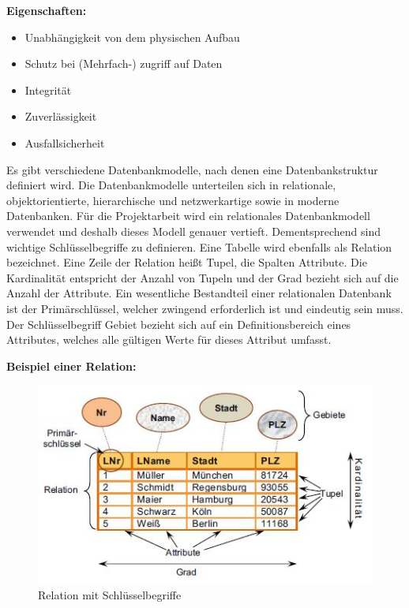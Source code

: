\documentclass[a4paper,titlepage,halfparskip,12pt]{scrreprt}
\begin{document}
\begin{onehalfspacing}
\smallskip

\textbf{Eigenschaften:}
\begin{itemize}
	\item Unabhängigkeit von dem physischen Aufbau
	\item Schutz bei (Mehrfach-) zugriff auf Daten
	\item Integrität
	\item Zuverlässigkeit
	\item Ausfallsicherheit
\end{itemize}

Es gibt verschiedene Datenbankmodelle, nach denen eine Datenbankstruktur definiert wird. Die Datenbankmodelle unterteilen sich in relationale, objektorientierte, hierarchische und netzwerkartige sowie in moderne Datenbanken. Für die Projektarbeit wird ein relationales Datenbankmodell verwendet und deshalb dieses Modell genauer vertieft. Dementsprechend sind wichtige Schlüsselbegriffe zu definieren. Eine Tabelle wird ebenfalls als Relation bezeichnet. Eine Zeile der Relation heißt Tupel, die Spalten Attribute. Die Kardinalität entspricht der Anzahl von Tupeln und der Grad bezieht sich auf die Anzahl der Attribute. Ein wesentliche Bestandteil einer relationalen Datenbank ist der Primärschlüssel, welcher zwingend erforderlich ist und eindeutig sein muss. Der Schlüsselbegriff Gebiet bezieht sich auf ein Definitionsbereich eines Attributes, welches alle gültigen Werte für dieses Attribut umfasst. \cite{Schicker2017}

\newpage

\smallskip

\textbf{Beispiel einer Relation:}

\smallskip

\begin{figure}[h]
	\centering
	\includegraphics[scale=1.2]{images/RelationMitSchluesselbegriffe}
	\caption{Relation mit Schlüsselbegriffe \cite{Schicker2017}}
	\label{img:RelationDB_Begriffe}
\end{figure}


\end{onehalfspacing}
\end{document}
